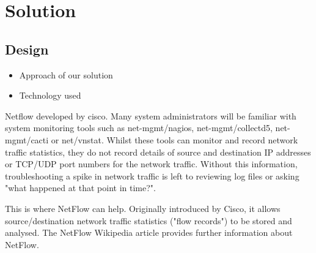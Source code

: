\part{Solution} \label{part:solution}

\chapter{Design}

\begin{itemize}
	\item Approach of our solution
	\item Technology used
\end{itemize}

Netflow developed by cisco. Many system administrators will be familiar with system monitoring tools such as net-mgmt/nagios, net-mgmt/collectd5, net-mgmt/cacti or net/vnstat. Whilst these tools can monitor and record network traffic statistics, they do not record details of source and destination IP addresses or TCP/UDP port numbers for the network traffic. Without this information, troubleshooting a spike in network traffic is left to reviewing log files or asking "what happened at that point in time?".

This is where NetFlow can help. Originally introduced by Cisco, it allows source/destination network traffic statistics ("flow records") to be stored and analysed. The NetFlow Wikipedia article provides further information about NetFlow.

